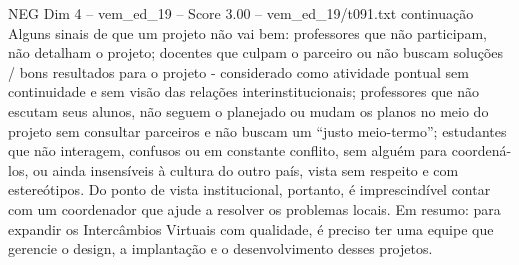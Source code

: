 \begin{textsample}{NEG Dim 4 – vem\_ed\_19 – Score 3.00 – vem\_ed\_19/t091.txt}  \label{ex:f4_neg_059}
continuação Alguns sinais de que um projeto não vai bem: professores que não participam, não detalham o projeto; docentes que culpam o parceiro ou não buscam soluções / bons resultados para o projeto - considerado como atividade pontual sem continuidade e sem visão das relações interinstitucionais; professores que não escutam seus alunos, não seguem o planejado ou mudam os planos no meio do projeto sem consultar parceiros e não buscam um “justo meio-termo”; estudantes que não interagem, confusos ou em constante conflito, sem alguém para coordená-los, ou ainda insensíveis à cultura do outro país, vista sem respeito e com estereótipos.
Do ponto de vista institucional, portanto, é imprescindível contar com um coordenador que ajude a resolver os problemas locais.
Em resumo: para expandir os Intercâmbios Virtuais com qualidade, é preciso ter uma equipe que gerencie o design, a implantação e o desenvolvimento desses projetos.

\end{textsample}
